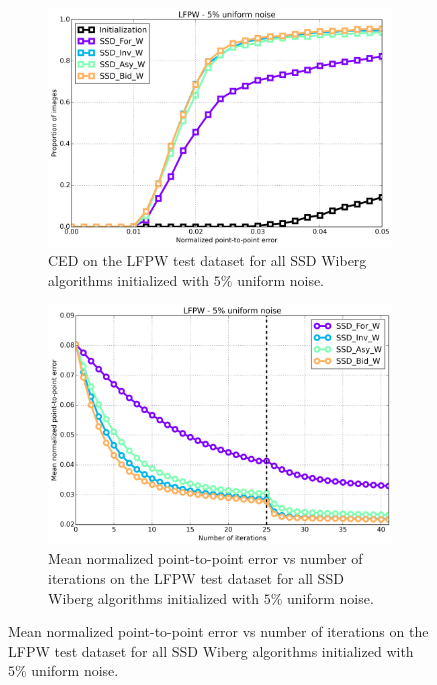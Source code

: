 \begin{figure}[p]
	\centering
	\begin{subfigure}{0.48\textwidth}
	    \includegraphics[width=\textwidth]{experiments/algorithms/ssd_w/ced_ssd_w_5.png}
	    \caption{CED on the LFPW test dataset for all SSD Wiberg algorithms initialized with $5\%$ uniform noise.}
	    \label{fig:ced_ssd_w_5}
	\end{subfigure}
	\hfill
	\begin{subfigure}{0.48\textwidth}
	    \includegraphics[width=\textwidth]{experiments/algorithms/ssd_w/mean_error_vs_iters_ssd_w_5.png}
	    \caption{Mean normalized point-to-point error vs number of iterations on the LFPW test dataset for all SSD Wiberg algorithms initialized with $5\%$ uniform noise.}
	    \label{fig:mean_error_vs_iters_ssd_w_5}
	\end{subfigure}

\end{figure}
